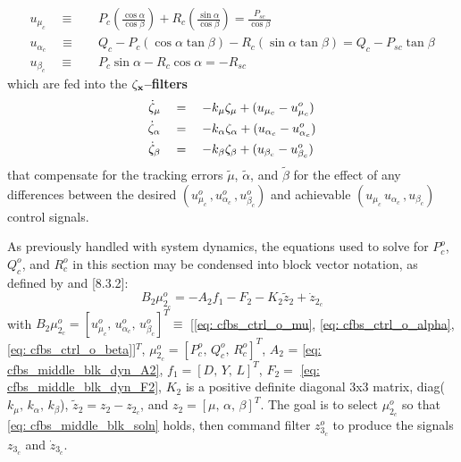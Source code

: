 \documentclass[12pt]{ucthesis}
\begin{document}
	\begin{align}
		\label{eq: cfbs_ctrl_mu}		u_{\mu_c} 		\quad \equiv& \quad P_c\left(\frac{\cos\alpha}{\cos\beta}\right) + R_c\left(\frac{\sin\alpha}{\cos\beta}\right) = \frac{P_{sc}}{\cos\beta} \\
		\label{eq: cfbs_ctrl_alpha}	u_{\alpha_c} 	\quad \equiv& \quad Q_c -P_c(\cos\alpha\tan\beta)  -R_c(\sin\alpha\tan\beta) =  Q_c - P_{sc}\tan\beta \\
		\label{eq: cfbs_ctrl_beta}	u_{\beta_c} 	\quad \equiv& \quad P_c \sin\alpha - R_c \cos\alpha = -R_{sc} 
	\end{align}
which are fed into the $\mathbf{\zeta_x}$\textbf{--filters}
	\begin{align}
		\label{eq: cfbs_filt_mu}	\dot{\zeta}_{\mu} \quad&=\quad -k_{\mu} \zeta_{\mu} + (u_{\mu_c} - u^{o}_{\mu_c}) \\
		\label{eq: cfbs_filt_alph}	\dot{\zeta}_{\alpha} \quad&=\quad -k_{\alpha} \zeta_{\alpha} + (u_{\alpha_c} - u^o_{\alpha_c}) \\
		\label{eq: cfbs_filt_beta}	\dot{\zeta}_{\beta} \quad&=\quad -k_{\beta} \zeta_{\beta} + (u_{\beta_c} - u^o_{\beta_c})
	\end{align}
that compensate for the tracking errors $\tilde{\mu}$, $\tilde{\alpha}$, and $\tilde{\beta}$ for the effect of any differences between the desired $(u^o_{\mu_c}\,,u^o_{\alpha_c}\,,u^o_{\beta_c})$ and achievable $(u_{\mu_c}\,u_{\alpha_c}\,,u_{\beta_c})$ control signals.

As previously handled with system dynamics, the equations used to solve for $P^o_c$, $Q^o_c$, and $R^o_c$ in this section may be condensed into block vector notation, as defined by \citet{Farrell2005} and \citet{Farrell2006}[8.3.2]:%
	\begin{equation} \label{eq: cfbs_middle_blk_soln}%
		B_2 \mu^o_{2_c} = -A_2 f_1 -F_2 -K_2 \tilde{z}_2 + \dot{z}_{2_c}
	\end{equation}
with $B_2 \mu^o_{2_c} = [u^{o}_{\mu_c},\,u^{o}_{\alpha_c},\,u^{o}_{\beta_c}]^T \equiv $ [\ref{eq: cfbs_ctrl_o_mu}, \ref{eq: cfbs_ctrl_o_alpha}, \ref{eq: cfbs_ctrl_o_beta}]$^T$, $\mu^o_{2_c} = [P^o_c,\,Q^o_c,\, R^o_c]^T$, $A_2$ = \autoref{eq: cfbs_middle_blk_dyn_A2}, $f_1 = [D,\,Y,\,L]^T$, $F_2 =$ \autoref{eq: cfbs_middle_blk_dyn_F2}, $K_2$ is a positive definite diagonal 3x3 matrix, diag($k_\mu,\,k_\alpha,\,k_\beta$), $\tilde{z}_2 = z_2 - z_{2_c}$, and $z_2 = [\mu,\,\alpha,\,\beta]^T$.  The goal is to select $\mu^o_{2_c}$ so that \autoref{eq: cfbs_middle_blk_soln} holds, then command filter $z^o_{3_c}$ to produce the signals $z_{3_c}$ and $\dot{z}_{3_c}$.
\end{document}
